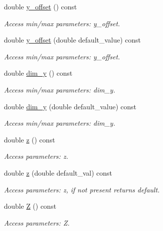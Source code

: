 \begin{DoxyCompactItemize}
double \hyperlink{struct_d_d4hep_1_1_x_m_l_1_1_dimension_ad9ecf376ee7a032ed8dd90e5909a3211}{y\+\_\+offset} () const
\begin{DoxyCompactList}\small\item\em Access min/max parameters\+: y\+\_\+offset. \end{DoxyCompactList}\item 
double \hyperlink{struct_d_d4hep_1_1_x_m_l_1_1_dimension_a770c462f706c13e21481db1b4886e236}{y\+\_\+offset} (double default\+\_\+value) const
\begin{DoxyCompactList}\small\item\em Access min/max parameters\+: y\+\_\+offset. \end{DoxyCompactList}\item 
double \hyperlink{struct_d_d4hep_1_1_x_m_l_1_1_dimension_a8e497516b52699f3b97c989f8a5c7341}{dim\+\_\+y} () const
\begin{DoxyCompactList}\small\item\em Access min/max parameters\+: dim\+\_\+y. \end{DoxyCompactList}\item 
double \hyperlink{struct_d_d4hep_1_1_x_m_l_1_1_dimension_ad693522df5b2d13bee55d8bfc4ae1373}{dim\+\_\+y} (double default\+\_\+value) const
\begin{DoxyCompactList}\small\item\em Access min/max parameters\+: dim\+\_\+y. \end{DoxyCompactList}\item 
double \hyperlink{struct_d_d4hep_1_1_x_m_l_1_1_dimension_ad98d94d3403d936796f65ec4b45f7dbb}{z} () const
\begin{DoxyCompactList}\small\item\em Access parameters\+: z. \end{DoxyCompactList}\item 
double \hyperlink{struct_d_d4hep_1_1_x_m_l_1_1_dimension_a73b44b93f09a731f0a5c77493b9253ae}{z} (double default\+\_\+val) const
\begin{DoxyCompactList}\small\item\em Access parameters\+: z, if not present returns default. \end{DoxyCompactList}\item 
double \hyperlink{struct_d_d4hep_1_1_x_m_l_1_1_dimension_ac407c9b56f9ac54ffbd172f8ccda2dab}{Z} () const
\begin{DoxyCompactList}\small\item\em Access parameters\+: Z. \end{DoxyCompactList}\item 

\end{DoxyCompactItemize}
